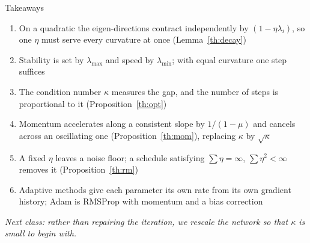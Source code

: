 \documentclass[aspectratio=169, 11pt]{beamer}
\newcommand{\bridge}[1]{%
  {\scriptsize\itshape\color{mcMuted} #1\par}\vspace{0.35em}}
\newcommand{\nosrc}{}       %
\begin{document}
\begin{frame}{Takeaways}
  \nosrc
  \vspace{0.15em}
  \vspace{-0.15em}
  {\footnotesize
  \begin{enumerate}\itemsep0.30em
    \item On a quadratic the eigen-directions contract independently by
          $(1-\eta\lambda_i)$, so one $\eta$ must serve every curvature
          at once (Lemma~\ref{th:decay})
    \item Stability is set by $\lambda_{\max}$ and speed by
          $\lambda_{\min}$; with equal curvature one step suffices
    \item The condition number $\kappa$ measures the gap, and the number
          of steps is proportional to it (Proposition~\ref{th:opt})
    \item Momentum accelerates along a consistent slope by
          $1/(1-\mu)$ and cancels across an oscillating one
          (Proposition~\ref{th:mom}), replacing $\kappa$ by
          $\sqrt{\kappa}$
    \item A fixed $\eta$ leaves a noise floor; a schedule satisfying
          $\sum\eta = \infty$, $\sum\eta^2 < \infty$ removes it
          (Proposition~\ref{th:rm})
    \item Adaptive methods give each parameter its own rate from its
          own gradient history; Adam is RMSProp with momentum and a
          bias correction
  \end{enumerate}}
  \vspace{0.2em}
  \bridge{Next class: rather than repairing the iteration, we rescale
  the network so that $\kappa$ is small to begin with.}
\end{frame}
\end{document}
